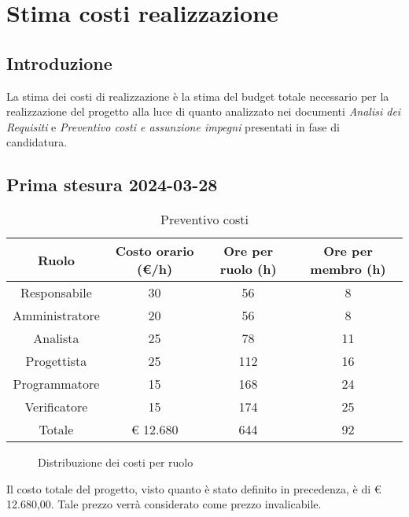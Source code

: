 
\section{Stima costi realizzazione}
\subsection{Introduzione}
La stima dei costi di realizzazione è la stima del budget totale necessario per la realizzazione del progetto alla luce di quanto analizzato nei documenti \textit{Analisi dei Requisiti} e \textit{Preventivo costi e assunzione impegni} presentati in fase di candidatura.

\subsection{Prima stesura 2024-03-28}

\begin{table}[!h]
	\centering
		\begin{tabular}{ | c | c | c | c | }
			\hline
			\textbf{Ruolo}   & \textbf{Costo orario (€/h)} & \textbf{Ore per ruolo (h)} & \textbf{Ore per membro (h)} \\
			\hline
			Responsabile   & 30           & 56            & 8              \\
			Amministratore & 20           & 56            & 8              \\
			Analista       & 25           & 78            & 11             \\
			Progettista    & 25           & 112           & 16             \\
			Programmatore  & 15           & 168           & 24             \\
			Verificatore   & 15           & 174           & 25             \\
			\hline
			Totale         & € 12.680     & 644           & 92             \\
			\hline
		\end{tabular}
        \caption{Preventivo costi}
    \label{tab:12}
\end{table}

\begin{figure}[!h]
    \centering
    \caption{Distribuzione dei costi per ruolo}
    \label{fig:1}
\end{figure}

Il costo totale del progetto, visto quanto è stato definito in precedenza, è di € 12.680,00. Tale prezzo verrà considerato come prezzo invalicabile.

